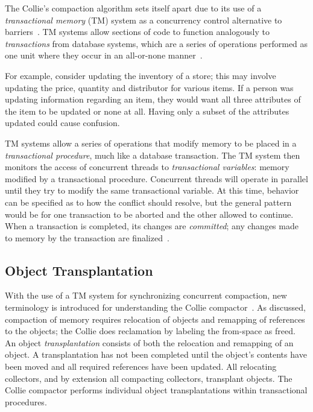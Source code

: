 \documentclass{sig-alternate}
\begin{document}
The Collie's compaction algorithm sets itself apart due to its use 
of a \emph{transactional memory} (TM) system as a concurrency control 
alternative to barriers~\cite{Iyengar:Collie}. TM systems allow
sections of code to function 
analogously to \emph{transactions} from database systems, 
which are a series of operations performed as one unit where 
they occur in an all-or-none manner~\cite{wiki:atomicity}.

For example, consider updating the inventory of a store; this may involve updating
the price, quantity and distributor for various items. 
If a person was updating information regarding an item, they would 
want all three attributes of the item to be updated or none at all. Having
only a subset of the attributes updated could cause confusion.

TM systems allow a series
of operations that modify memory to be placed in
a \emph{transactional procedure}, much like a database transaction.
The TM system then monitors the access of concurrent threads to \emph{transactional variables}:
memory modified by a transactional procedure.
Concurrent threads will operate in parallel until they try to modify
the same transactional variable. At this time, behavior can be specified as to how 
the conflict should resolve, but the general pattern would be for one transaction
to be aborted and the other allowed to continue.
When a transaction is completed, its changes are \emph{committed}; any changes 
made to memory by the transaction are finalized~\cite{wiki:transactional-memory}.


\subsection{Object Transplantation}
\label{sec:collieTransplantation}

With the use of a TM system for synchronizing concurrent compaction,
new terminology is introduced for understanding the Collie 
compactor~\cite{Iyengar:Collie}. As discussed, compaction of
memory requires relocation of objects and remapping of references to
the objects; the Collie does reclamation by labeling the from-space as freed.
An object \emph{transplantation} consists of both the relocation and 
remapping of an object. A transplantation has not been completed until
the object's contents have been moved and all required references have been
updated. All relocating collectors, and by extension all
compacting collectors, transplant objects. The Collie compactor 
performs individual object transplantations within transactional procedures. 
\end{document}
